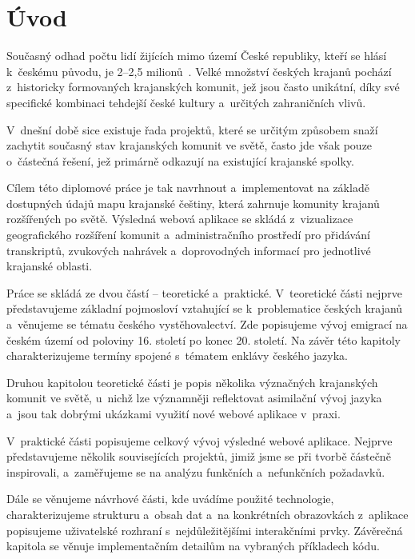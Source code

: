 \hypertarget{uxfavod}{%
\chapter*{Úvod}\label{uvod}}

Současný odhad počtu lidí žijících mimo území České republiky, kteří se hlásí k~českému původu, je 2--2,5 milionů~\parencite{Krajane-mv2}. Velké množství českých krajanů pochází z~historicky formovaných krajanských komunit, jež jsou často unikátní, díky své specifické kombinaci tehdejší české kultury a~určitých zahraničních vlivů.

V~dnešní době sice existuje řada projektů, které se určitým způsobem snaží zachytit současný stav krajanských komunit ve světě, často jde však pouze o~částečná řešení, jež primárně odkazují na existující krajanské spolky.

Cílem této diplomové práce je tak navrhnout a~implementovat na základě dostupných údajů mapu krajanské češtiny, která zahrnuje komunity krajanů rozšířených po světě. Výsledná webová aplikace se skládá z~vizualizace geografického rozšíření komunit a~administračního prostředí pro přidávání transkriptů, zvukových nahrávek a~doprovodných informací pro jednotlivé krajanské oblasti.

Práce se skládá ze dvou částí -- teoretické a~praktické. V~teoretické části nejprve představujeme základní pojmosloví vztahující se k~problematice českých krajanů a~věnujeme se tématu českého vystěhovalectví. Zde popisujeme vývoj emigrací na českém území od poloviny 16. století po konec 20. století. Na závěr této kapitoly charakterizujeme termíny spojené s~tématem enklávy českého jazyka.

Druhou kapitolou teoretické části je popis několika význačných krajanských komunit ve světě, u~nichž lze významněji reflektovat asimilační vývoj jazyka a~jsou tak dobrými ukázkami využití nové webové aplikace v~praxi.

V~praktické části popisujeme celkový vývoj výsledné webové aplikace. Nejprve představujeme několik souvisejících projektů, jimiž jsme se při tvorbě částečně inspirovali, a~zaměřujeme se na analýzu funkčních a~nefunkčních požadavků.

Dále se věnujeme návrhové části, kde uvádíme použité technologie, charakterizujeme strukturu a~obsah dat a~na konkrétních obrazovkách z~aplikace popisujeme uživatelské rozhraní s~nejdůležitějšími interakčními prvky. Závěrečná kapitola se věnuje implementačním detailům na vybraných příkladech kódu.
